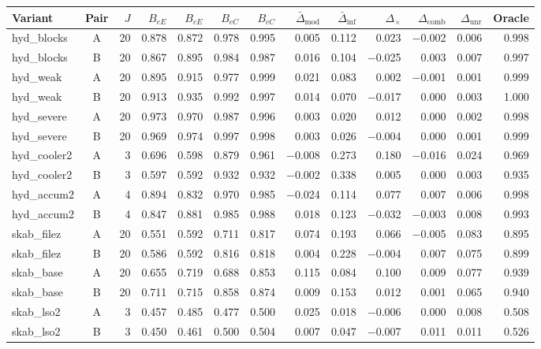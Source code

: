 \begin{tabular}{@{}l c r rrrrrrrrrr@{}}
\toprule
Variant & Pair & $J$ & $B_{eE}$ & $B_{cE}$ & $B_{eC}$ & $B_{cC}$ & $\bar\Delta_{\mathrm{mod}}$ & $\bar\Delta_{\mathrm{inf}}$ & $\Delta_{\times}$ & $\Delta_{\mathrm{comb}}$ & $\Delta_{\mathrm{unr}}$ & Oracle \\
\midrule
hyd\_blocks & A & 20 & 0.878 & 0.872 & 0.978 & 0.995 & 0.005 & 0.112 & 0.023 & $-$0.002 & 0.006 & 0.998 \\
hyd\_blocks & B & 20 & 0.867 & 0.895 & 0.984 & 0.987 & 0.016 & 0.104 & $-$0.025 & 0.003 & 0.007 & 0.997 \\
hyd\_weak & A & 20 & 0.895 & 0.915 & 0.977 & 0.999 & 0.021 & 0.083 & 0.002 & $-$0.001 & 0.001 & 0.999 \\
hyd\_weak & B & 20 & 0.913 & 0.935 & 0.992 & 0.997 & 0.014 & 0.070 & $-$0.017 & 0.000 & 0.003 & 1.000 \\
hyd\_severe & A & 20 & 0.973 & 0.970 & 0.987 & 0.996 & 0.003 & 0.020 & 0.012 & 0.000 & 0.002 & 0.998 \\
hyd\_severe & B & 20 & 0.969 & 0.974 & 0.997 & 0.998 & 0.003 & 0.026 & $-$0.004 & 0.000 & 0.001 & 0.999 \\
hyd\_cooler2 & A & 3 & 0.696 & 0.598 & 0.879 & 0.961 & $-$0.008 & 0.273 & 0.180 & $-$0.016 & 0.024 & 0.969 \\
hyd\_cooler2 & B & 3 & 0.597 & 0.592 & 0.932 & 0.932 & $-$0.002 & 0.338 & 0.005 & 0.000 & 0.003 & 0.935 \\
hyd\_accum2 & A & 4 & 0.894 & 0.832 & 0.970 & 0.985 & $-$0.024 & 0.114 & 0.077 & 0.007 & 0.006 & 0.998 \\
hyd\_accum2 & B & 4 & 0.847 & 0.881 & 0.985 & 0.988 & 0.018 & 0.123 & $-$0.032 & $-$0.003 & 0.008 & 0.993 \\
skab\_filez & A & 20 & 0.551 & 0.592 & 0.711 & 0.817 & 0.074 & 0.193 & 0.066 & $-$0.005 & 0.083 & 0.895 \\
skab\_filez & B & 20 & 0.586 & 0.592 & 0.816 & 0.818 & 0.004 & 0.228 & $-$0.004 & 0.007 & 0.075 & 0.899 \\
skab\_base & A & 20 & 0.655 & 0.719 & 0.688 & 0.853 & 0.115 & 0.084 & 0.100 & 0.009 & 0.077 & 0.939 \\
skab\_base & B & 20 & 0.711 & 0.715 & 0.858 & 0.874 & 0.009 & 0.153 & 0.012 & 0.001 & 0.065 & 0.940 \\
skab\_lso2 & A & 3 & 0.457 & 0.485 & 0.477 & 0.500 & 0.025 & 0.018 & $-$0.006 & 0.000 & 0.008 & 0.508 \\
skab\_lso2 & B & 3 & 0.450 & 0.461 & 0.500 & 0.504 & 0.007 & 0.047 & $-$0.007 & 0.011 & 0.011 & 0.526 \\

\end{tabular}
